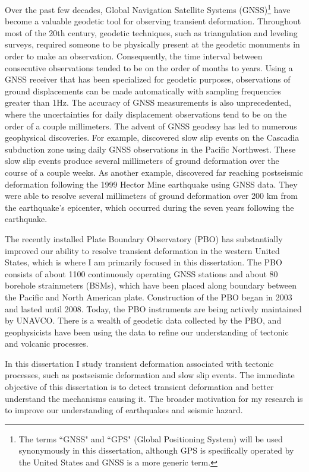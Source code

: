 Over the past few decades, Global Navigation Satellite Systems
(GNSS)\footnote{The terms ``GNSS" and ``GPS" (Global Positioning
System) will be used synonymously in this dissertation, although GPS
is specifically operated by the United States and GNSS is a more
generic term.} have become a valuable geodetic tool for observing
transient deformation. Throughout most of the 20th century, geodetic
techniques, such as triangulation and leveling surveys, required
someone to be physically present at the geodetic monuments in order to
make an observation. Consequently, the time interval between
consecutive observations tended to be on the order of months to years.
Using a GNSS receiver that has been specialized for geodetic purposes,
observations of ground displacements can be made automatically with
sampling frequencies greater than 1Hz. The accuracy of GNSS
measurements is also unprecedented, where the uncertainties for daily
displacement observations tend to be on the order of a couple
millimeters. The advent of GNSS geodesy has led to numerous
geophysical discoveries. For example, \citet{Dragert2001} discovered
slow slip events on the Cascadia subduction zone using daily GNSS
observations in the Pacific Northwest. These slow slip events produce
several millimeters of ground deformation over the course of a couple
weeks. As another example, \citet{Freed2007} discovered far reaching
postseismic deformation following the 1999 Hector Mine earthquake
using GNSS data. They were able to resolve several millimeters of
ground deformation over 200 km from the earthquake's epicenter, which
occurred during the seven years following the earthquake.

The recently installed Plate Boundary Observatory (PBO) has
substantially improved our ability to resolve transient deformation in
the western United States, which is where I am primarily focused in
this dissertation. The PBO consists of about 1100 continuously
operating GNSS stations and about 80 borehole strainmeters (BSMs),
which have been placed along boundary between the Pacific and North
American plate. Construction of the PBO began in 2003 and lasted until
2008. Today, the PBO instruments are being actively maintained by
UNAVCO. There is a wealth of geodetic data collected by the PBO, and
geophysicists have been using the data to refine our understanding of
tectonic and volcanic processes.

In this dissertation I study transient deformation associated with
tectonic processes, such as postseismic deformation and slow slip
events. The immediate objective of this dissertation is to detect
transient deformation and better understand the mechanisms causing it.
The broader motivation for my research is to improve our understanding
of earthquakes and seismic hazard. 



